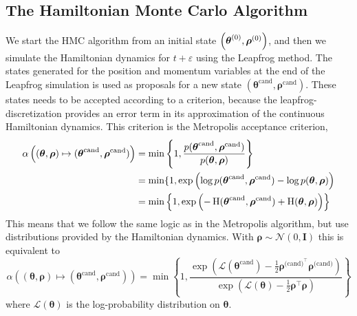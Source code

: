 \subsection{The Hamiltonian Monte Carlo Algorithm}
We start the HMC algorithm from an initial state $\left (\boldsymbol{\theta}^{(0)},\boldsymbol{\rho}^{(0)}\right)$, and then we simulate the Hamiltonian dynamics for $t+\varepsilon$ using the Leapfrog method. The states generated for the position and momentum variables at the end of the Leapfrog simulation is used as proposals for a new state $(\boldsymbol{\theta}^{\text{cand}},\boldsymbol{\rho}^{\text{cand}})$. These states needs to be accepted according to a criterion, because the leapfrog-discretization provides an error term in its approximation of the continuous Hamiltonian dynamics. This criterion is the Metropolis acceptance criterion,
\begin{equation}\label{eq:hmc_acceptance}
\begin{split}
    \alpha\left((\boldsymbol{\theta},\boldsymbol{\rho}) \mapsto (\boldsymbol{\theta}^{\text{cand}} , \boldsymbol{\rho}^{\text{cand}} )\right) &= \min\left\{1, \frac{p(\boldsymbol{\theta}^{\text{cand}},\boldsymbol{\rho}^{\text{cand}})}{p(\boldsymbol{\theta},\boldsymbol{\rho})} \right\}\\
    &= \min\{1,\exp\left(\log p(\boldsymbol{\theta}^{\text{cand}},\boldsymbol{\rho}^{\text{cand}})- \log p(\boldsymbol{\theta}, \boldsymbol{\rho})  \right)\\
    &= \min \left\{1,\exp\left(-\operatorname{H}(\boldsymbol{\theta}^{\text{cand}},\boldsymbol{\rho}^{\text{cand}}) +\operatorname{H}(\boldsymbol{\theta},\boldsymbol{\rho})\right) \right\}
\end{split}
\end{equation}
This means that we follow the same logic as in the Metropolis algorithm, but use distributions provided by the Hamiltonian dynamics. With $\boldsymbol{\rho}\sim \mathcal{N}\left(0,\boldsymbol{I}\right)$ this is equivalent to
\begin{equation*}
\alpha\left((\boldsymbol{\theta},\boldsymbol{\rho}) \mapsto (\boldsymbol{\theta}^{\text{cand}} , \boldsymbol{\rho}^{\text{cand}} )\right) 
=\min\left\{1,\frac{\exp\left(\mathcal{L}(\boldsymbol{\theta}^{\text{cand}})-\frac{1}{2}\boldsymbol{\rho}^{\text{(cand)}^\top}\boldsymbol{\rho}^{\text{(cand)}}\right)}{\exp\left(\mathcal{L}(\boldsymbol{\theta})-\frac{1}{2}\boldsymbol{\rho}^\top\boldsymbol{\rho}\right)}\right\}
\end{equation*}
where $\mathcal{L}\left(\boldsymbol{\theta}\right)$ is the log-probability distribution on $\boldsymbol{\theta}$.
